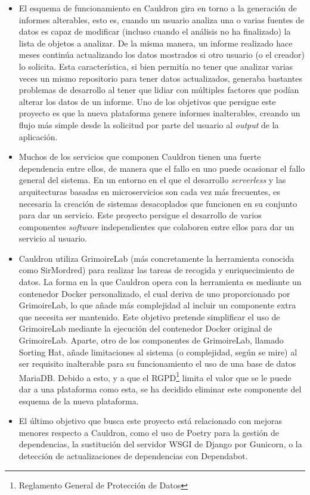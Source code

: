 \begin{itemize}
    \item El esquema de funcionamiento en Cauldron gira en torno a la generación de informes alterables, esto es, cuando un usuario analiza una o varias fuentes de datos es capaz de modificar (incluso cuando el análisis no ha finalizado) la lista de objetos a analizar. De la misma manera, un informe realizado hace meses continúa actualizando los datos mostrados si otro usuario (o el creador) lo solicita. Esta característica, si bien permitía no tener que analizar varias veces un mismo repositorio para tener datos actualizados, generaba bastantes problemas de desarrollo al tener que lidiar con múltiples factores que podían alterar los datos de un informe. Uno de los objetivos que persigue este proyecto es que la nueva plataforma genere informes inalterables, creando un flujo más simple desde la solicitud por parte del usuario al \emph{output} de la aplicación.
    \item Muchos de los servicios que componen Cauldron tienen una fuerte dependencia entre ellos, de manera que el fallo en uno puede ocasionar el fallo general del sistema. En un entorno en el que el desarrollo \emph{serverless} y las arquitecturas basadas en microservicios son cada vez más frecuentes, es necesaria la creación de sistemas desacoplados que funcionen en su conjunto para dar un servicio. Este proyecto persigue el desarrollo de varios componentes \emph{software} independientes que colaboren entre ellos para dar un servicio al usuario.
    \item Cauldron utiliza GrimoireLab (más concretamente la herramienta conocida como SirMordred) para realizar las tareas de recogida y enriquecimiento de datos. La forma en la que Cauldron opera con la herramienta es mediante un contenedor Docker personalizado, el cual deriva de uno proporcionado por GrimoireLab, lo que añade más complejidad al incluir un componente extra que necesita ser mantenido. Este objetivo pretende simplificar el uso de GrimoireLab mediante la ejecución del contenedor Docker original de GrimoireLab. Aparte, otro de los componentes de GrimoireLab, llamado Sorting Hat, añade limitaciones al sistema (o complejidad, según se mire) al ser requisito inalterable para su funcionamiento el uso de una base de datos MariaDB. Debido a esto, y a que el RGPD\footnote{Reglamento General de Protección de Datos} limita el valor que se le puede dar a una plataforma como esta, se ha decidido eliminar este componente del esquema de la nueva plataforma.
    \item El último objetivo que busca este proyecto está relacionado con mejoras menores respecto a Cauldron, como el uso de Poetry para la gestión de dependencias, la sustitución del servidor WSGI de Django por Gunicorn, o la detección de actualizaciones de dependencias con Dependabot.
\end{itemize}
